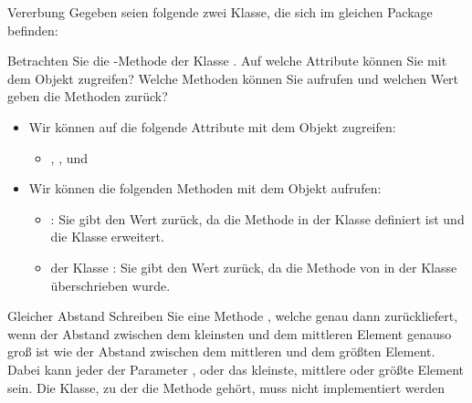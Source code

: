 \documentclass{../tuda-exercise}
\begin{document}
  \clearpagesolution

  \begin{task}[credit=\stars{1}{3}]{Vererbung}
    Gegeben seien folgende zwei Klasse, die sich im gleichen Package befinden:

    

    Betrachten Sie die -Methode der Klasse . Auf welche Attribute
    können Sie mit dem Objekt  zugreifen? Welche Methoden können Sie aufrufen und
    welchen Wert geben die Methoden zurück?

    \begin{solution}
      \begin{itemize}
        \item Wir können auf die folgende Attribute mit dem Objekt  zugreifen:
        \begin{itemize}
          \item {}, ,  und 
        \end{itemize}
        \item Wir können die folgenden Methoden mit dem Objekt  aufrufen:
        \begin{itemize}
          \item {}: Sie gibt den Wert  zurück, da die Methode in der
          Klasse  definiert ist und die Klasse  
          erweitert.
          \item {} der Klasse : Sie gibt den Wert 
          zurück, da die Methode  von  in der Klasse
           überschrieben wurde.
        \end{itemize}
      \end{itemize}
    \end{solution}
  \end{task}

  \begin{task}[credit=\stars{2}{3}]{Gleicher Abstand}
    Schreiben Sie eine Methode ,
    welche genau dann  zurückliefert, wenn der Abstand zwischen dem kleinsten
    und dem mittleren Element genauso groß ist wie der Abstand zwischen dem mittleren und dem
    größten Element. Dabei kann jeder der Parameter ,  oder
     das kleinste, mittlere oder größte Element sein. Die Klasse, zu der die
    Methode gehört, muss nicht implementiert werden

    \begin{solution}
      
    \end{solution}
  \end{task}
\end{document}
